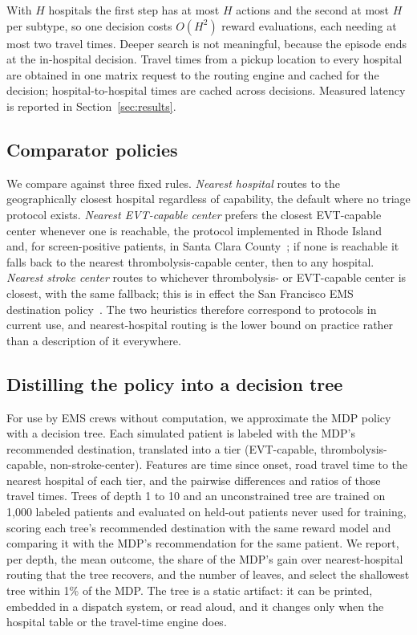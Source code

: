 With $H$ hospitals the first step has at most $H$ actions and the second at most $H$ per subtype, so one decision costs $O(H^2)$ reward evaluations, each needing at most two travel times. Deeper search is not meaningful, because the episode ends at the in-hospital decision. Travel times from a pickup location to every hospital are obtained in one matrix request to the routing engine and cached for the decision; hospital-to-hospital times are cached across decisions. Measured latency is reported in Section~\ref{sec:results}.

\subsection{Comparator policies}
We compare against three fixed rules. \emph{Nearest hospital} routes to the geographically closest hospital regardless of capability, the default where no triage protocol exists. \emph{Nearest EVT-capable center} prefers the closest EVT-capable center whenever one is reachable, the protocol implemented in Rhode Island~\cite{jayaraman2023} and, for screen-positive patients, in Santa Clara County~\cite{scvems2021}; if none is reachable it falls back to the nearest thrombolysis-capable center, then to any hospital. \emph{Nearest stroke center} routes to whichever thrombolysis- or EVT-capable center is closest, with the same fallback; this is in effect the San Francisco EMS destination policy~\cite{sfems2020}. The two heuristics therefore correspond to protocols in current use, and nearest-hospital routing is the lower bound on practice rather than a description of it everywhere.

\subsection{Distilling the policy into a decision tree}
For use by EMS crews without computation, we approximate the MDP policy with a decision tree. Each simulated patient is labeled with the MDP's recommended destination, translated into a tier (EVT-capable, thrombolysis-capable, non-stroke-center). Features are time since onset, road travel time to the nearest hospital of each tier, and the pairwise differences and ratios of those travel times. Trees of depth 1 to 10 and an unconstrained tree are trained on 1,000 labeled patients and evaluated on held-out patients never used for training, scoring each tree's recommended destination with the same reward model and comparing it with the MDP's recommendation for the same patient. We report, per depth, the mean outcome, the share of the MDP's gain over nearest-hospital routing that the tree recovers, and the number of leaves, and select the shallowest tree within 1\% of the MDP. The tree is a static artifact: it can be printed, embedded in a dispatch system, or read aloud, and it changes only when the hospital table or the travel-time engine does.
